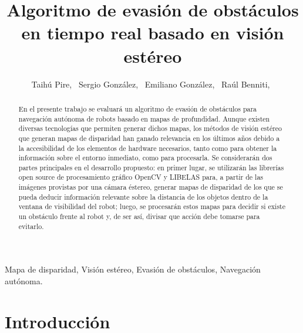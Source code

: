 \documentclass[journal]{IEEEtran}
\begin{document}
%
\title{Algoritmo de evasi\'on de obst\'aculos en tiempo real basado en visi\'on est\'ereo}

\author{Taih\'u Pire,~
        Sergio Gonz\'alez,~
        Emiliano Gonz\'alez,~
        Ra\'ul Benniti,~%
        }


\maketitle


\begin{abstract}
En el presente trabajo se evaluar\'a un algoritmo de evasi\'on de obst\'aculos para navegaci\'on aut\'onoma de robots basado en mapas de profundidad. Aunque existen diversas tecnolog\'ias que permiten generar dichos mapas, los m\'etodos de visi\'on est\'ereo que generan mapas de disparidad han ganado relevancia en los \'ultimos a\~nos debido a la accesibilidad de los elementos de hardware necesarios, tanto como para obtener la informaci\'on sobre el entorno inmediato, como para procesarla. Se considerar\'an dos partes principales en el desarrollo propuesto: en primer lugar, se utilizar\'an las librer\'ias open source de procesamiento gr\'afico OpenCV y LIBELAS para, a partir de las im\'agenes provistas por una c\'amara \'estereo, generar mapas de disparidad de los que se pueda deducir informaci\'on relevante sobre la distancia de los objetos dentro de la ventana de visibilidad del robot; luego, se procesar\'an estos mapas para decidir si existe un obst\'aculo frente al robot y, de ser as\'i, divisar que acci\'on debe tomarse para evitarlo.
\end{abstract}

\begin{IEEEkeywords}
Mapa de disparidad, Visi\'on est\'ereo, Evasi\'on de obst\'aculos, Navegaci\'on aut\'onoma.
\end{IEEEkeywords}


\IEEEpeerreviewmaketitle


\section{Introducci\'on}
\end{document}
